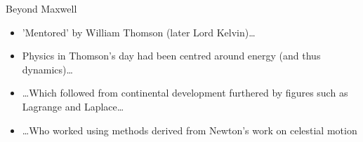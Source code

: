 \documentclass{beamer}
\newcommand{\customfootnotetext}[2]{{
\renewcommand{\thefootnote}{#1}
\footnotetext[0]{#2}}}
\begin{document}
  \begin{frame}{Beyond Maxwell}
  	\begin{itemize}
		\item 'Mentored' by William Thomson{\autocite{newchart}}  (later Lord Kelvin)\ldots
		\item Physics in Thomson's day had been centred around energy (and thus dynamics)\ldots
		\item\ldots Which followed from continental development furthered by figures such as Lagrange and Laplace\ldots
		\item \ldots Who worked using methods derived from Newton's work on celestial motion
  	\end{itemize}
  \end{frame}
\end{document}
